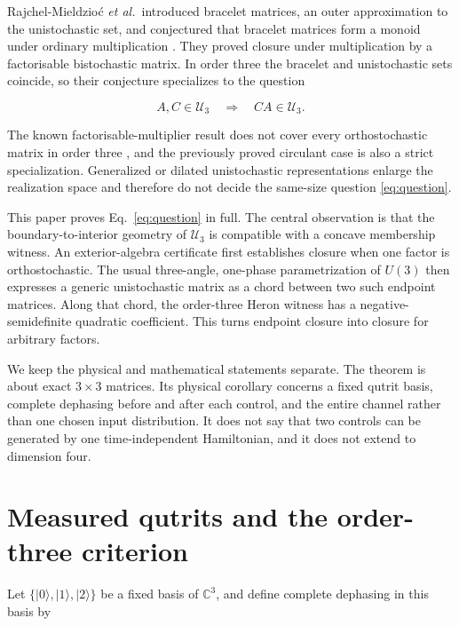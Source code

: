 \documentclass[aip,jmp,amsmath,amssymb,preprint,nofootinbib]{revtex4-2}
\newcommand{\Ud}{\mathcal{U}_3}
\begin{document}
Rajchel-Mieldzio\'c \emph{et al.}\ introduced bracelet matrices, an outer
approximation to the unistochastic set, and conjectured that bracelet
matrices form a monoid under ordinary multiplication
\cite{RajchelMieldzioc2022}.  They proved closure under multiplication by a
factorisable bistochastic matrix.  In order three the bracelet and
unistochastic sets coincide, so their conjecture specializes to the question

\begin{equation}
 A,C\in\Ud \quad\Longrightarrow\quad CA\in\Ud.
 \label{eq:question}
\end{equation}

The known factorisable-multiplier result does not cover every
orthostochastic matrix in order three \cite{PoonTsing1987}, and the previously
proved circulant case is also a strict specialization.  Generalized or
dilated unistochastic representations \cite{Nechita2023,Barandes2026} enlarge
the realization space and therefore do not decide the same-size question
\eqref{eq:question}.

This paper proves Eq.~\eqref{eq:question} in full.  The central observation is
that the boundary-to-interior geometry of $\Ud$ is compatible with a concave
membership witness.  An exterior-algebra certificate first establishes
closure when one factor is orthostochastic.  The usual three-angle,
one-phase parametrization of $U(3)$ then expresses a generic unistochastic
matrix as a chord between two such endpoint matrices.  Along that chord, the
order-three Heron witness has a negative-semidefinite quadratic coefficient.
This turns endpoint closure into closure for arbitrary factors.

We keep the physical and mathematical statements separate.  The theorem is
about exact $3\times3$ matrices.  Its physical corollary concerns a fixed
qutrit basis, complete dephasing before and after each control, and the
entire channel rather than one chosen input distribution.  It does not say
that two controls can be generated by one time-independent Hamiltonian, and
it does not extend to dimension four.

\section{Measured qutrits and the order-three criterion}
\label{sec:setup}

Let $\{|0\rangle,|1\rangle,|2\rangle\}$ be a fixed basis of
$\mathbb C^3$, and define complete dephasing in this basis by
\end{document}
